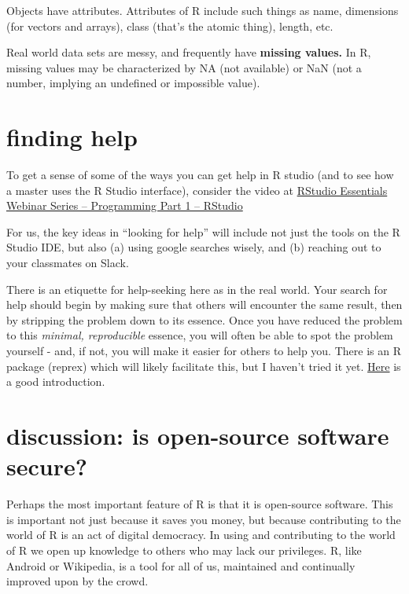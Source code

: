 \documentclass[openany]{book}
\begin{document}
Objects have attributes. Attributes of R include such things as name, dimensions (for vectors and arrays), class (that's the atomic thing), length, etc.

Real world data sets are messy, and frequently have \textbf{missing values.} In R, missing values may be characterized by NA (not available) or NaN (not a number, implying an undefined or impossible value).

\hypertarget{finding-help}{%
\section{finding help}\label{finding-help}}

To get a sense of some of the ways you can get help in R studio (and to see how a master uses the R Studio interface), consider the video at \href{https://www.rstudio.com/resources/webinars/rstudio-essentials-webinar-series-part-1/?wvideo=k8kz4e0p2v}{RStudio Essentials Webinar Series -- Programming Part 1 -- RStudio}

For us, the key ideas in ``looking for help'' will include not just the tools on the R Studio IDE, but also (a) using google searches wisely, and (b) reaching out to your classmates on Slack.

There is an etiquette for help-seeking here as in the real world. Your search for help should begin by making sure that others will encounter the same result, then by stripping the problem down to its essence. Once you have reduced the problem to this \emph{minimal, reproducible} essence, you will often be able to spot the problem yourself - and, if not, you will make it easier for others to help you. There is an R package (reprex) which will likely facilitate this, but I haven't tried it yet. \href{https://www.tidyverse.org/help/}{Here} is a good introduction.

\hypertarget{discussion-is-open-source-software-secure}{%
\section{discussion: is open-source software secure?}\label{discussion-is-open-source-software-secure}}

Perhaps the most important feature of R is that it is open-source software. This is important not just because it saves you money, but because contributing to the world of R is an act of digital democracy. In using and contributing to the world of R we open up knowledge to others who may lack our privileges. R, like Android or Wikipedia, is a tool for all of us, maintained and continually improved upon by the crowd.
\end{document}
